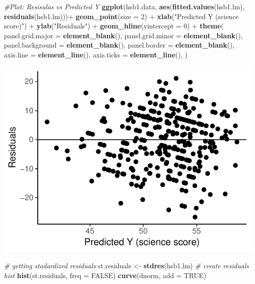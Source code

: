 \documentclass[]{article}
\newenvironment{Shaded}{\begin{snugshade}}{\end{snugshade}}
\newcommand{\KeywordTok}[1]{\textcolor[rgb]{0.13,0.29,0.53}{\textbf{{#1}}}}
\newcommand{\DataTypeTok}[1]{\textcolor[rgb]{0.13,0.29,0.53}{{#1}}}
\newcommand{\DecValTok}[1]{\textcolor[rgb]{0.00,0.00,0.81}{{#1}}}
\newcommand{\StringTok}[1]{\textcolor[rgb]{0.31,0.60,0.02}{{#1}}}
\newcommand{\CommentTok}[1]{\textcolor[rgb]{0.56,0.35,0.01}{\textit{{#1}}}}
\newcommand{\OtherTok}[1]{\textcolor[rgb]{0.56,0.35,0.01}{{#1}}}
\newcommand{\NormalTok}[1]{{#1}}
\begin{document}
\begin{Shaded}
\begin{Highlighting}[]
\CommentTok{#Plot: Resisulas vs Predicted Y }
\KeywordTok{ggplot}\NormalTok{(hsb1.data, }\KeywordTok{aes}\NormalTok{(}\KeywordTok{fitted.values}\NormalTok{(hsb1.lm), }\KeywordTok{residuals}\NormalTok{(hsb1.lm)))+}\StringTok{ }\KeywordTok{geom_point}\NormalTok{(}\DataTypeTok{size =} \DecValTok{2}\NormalTok{) +}\StringTok{ }\KeywordTok{xlab}\NormalTok{(}\StringTok{"Predicted Y (science score)"}\NormalTok{) +}\StringTok{ }\KeywordTok{ylab}\NormalTok{(}\StringTok{"Residuals"}\NormalTok{) +}\StringTok{ }\KeywordTok{geom_hline}\NormalTok{(}\DataTypeTok{yintercept =} \DecValTok{0}\NormalTok{) +}
\StringTok{   }\KeywordTok{theme}\NormalTok{(}
        \DataTypeTok{panel.grid.major =} \KeywordTok{element_blank}\NormalTok{(),}
        \DataTypeTok{panel.grid.minor =} \KeywordTok{element_blank}\NormalTok{(),}
        \DataTypeTok{panel.background =} \KeywordTok{element_blank}\NormalTok{(),}
        \DataTypeTok{panel.border =} \KeywordTok{element_blank}\NormalTok{(),}
        \DataTypeTok{axis.line =} \KeywordTok{element_line}\NormalTok{(),}
        \DataTypeTok{axis.ticks =} \KeywordTok{element_line}\NormalTok{(),}
     \NormalTok{)}
\end{Highlighting}
\end{Shaded}

\includegraphics{Homework_3_Revised_Minoo_files/figure-latex/unnamed-chunk-4-4.pdf}

\begin{Shaded}
\begin{Highlighting}[]
\CommentTok{# getting stadardized residuals}
\NormalTok{st.residuals <-}\StringTok{ }\KeywordTok{stdres}\NormalTok{(hsb1.lm)}
\CommentTok{# create residuals hist }
\KeywordTok{hist}\NormalTok{(st.residuals, }\DataTypeTok{freq =} \OtherTok{FALSE}\NormalTok{)}
\KeywordTok{curve}\NormalTok{(dnorm, }\DataTypeTok{add =} \OtherTok{TRUE}\NormalTok{)}
\end{Highlighting}
\end{Shaded}
\end{document}
